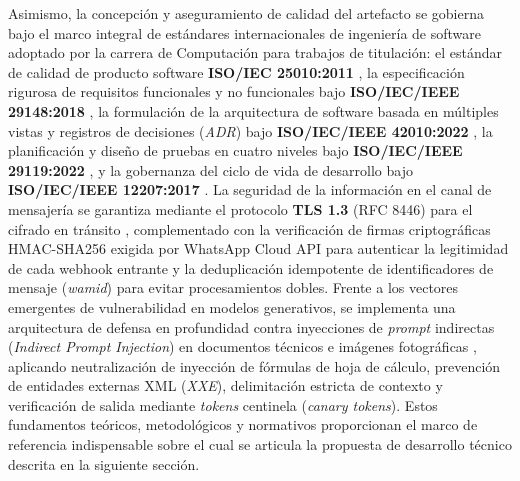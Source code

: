 Asimismo, la concepción y aseguramiento de calidad del artefacto se gobierna bajo el marco integral de estándares internacionales de ingeniería de software adoptado por la carrera de Computación para trabajos de titulación: el estándar de calidad de producto software \textbf{ISO/IEC 25010:2011} \parencite{iso25010}, la especificación rigurosa de requisitos funcionales y no funcionales bajo \textbf{ISO/IEC/IEEE 29148:2018} \parencite{iso29148}, la formulación de la arquitectura de software basada en múltiples vistas y registros de decisiones (\textit{ADR}) bajo \textbf{ISO/IEC/IEEE 42010:2022} \parencite{iso42010}, la planificación y diseño de pruebas en cuatro niveles bajo \textbf{ISO/IEC/IEEE 29119:2022} \parencite{iso29119}, y la gobernanza del ciclo de vida de desarrollo bajo \textbf{ISO/IEC/IEEE 12207:2017} \parencite{iso12207}. La seguridad de la información en el canal de mensajería se garantiza mediante el protocolo \textbf{TLS 1.3} (RFC 8446) para el cifrado en tránsito \parencite{rescorla2018tls}, complementado con la verificación de firmas criptográficas HMAC-SHA256 exigida por WhatsApp Cloud API para autenticar la legitimidad de cada webhook entrante y la deduplicación idempotente de identificadores de mensaje (\textit{wamid}) para evitar procesamientos dobles. Frente a los vectores emergentes de vulnerabilidad en modelos generativos, se implementa una arquitectura de defensa en profundidad contra inyecciones de \textit{prompt} indirectas (\textit{Indirect Prompt Injection}) en documentos técnicos e imágenes fotográficas \parencite{greshake2023not}, aplicando neutralización de inyección de fórmulas de hoja de cálculo, prevención de entidades externas XML (\textit{XXE}), delimitación estricta de contexto y verificación de salida mediante \textit{tokens} centinela (\textit{canary tokens}). Estos fundamentos teóricos, metodológicos y normativos proporcionan el marco de referencia indispensable sobre el cual se articula la propuesta de desarrollo técnico descrita en la siguiente sección.
